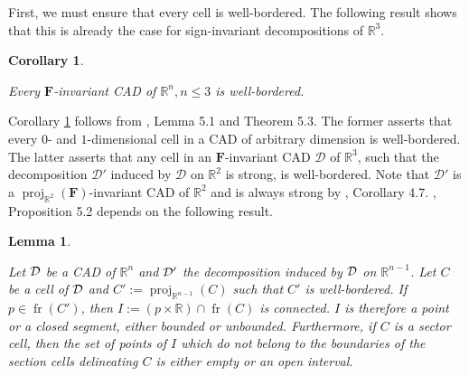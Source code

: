 \documentclass[
]{book}
\newtheorem{lemma}{Lemma}[chapter]
\newtheorem{corollary}{Corollary}[chapter]
\theoremstyle{definition}
\theoremstyle{definition}
\theoremstyle{definition}
\theoremstyle{definition}
\theoremstyle{remark}
\begin{document}
First, we must ensure that every cell is well-bordered. The following result shows that this is already the case for sign-invariant decompositions of \(\mathbb{R}^3\).

\begin{corollary}
\protect\hypertarget{cor:lazard-5-4}{}\label{cor:lazard-5-4}\citep[Corollary 5.4]{lazard10}

Every \(\mathbf{F}\)-invariant CAD of \(\mathbb{R}^n, n \le 3\) is well-bordered.
\end{corollary}

Corollary \ref{cor:lazard-5-4} follows from \citet{lazard10}, Lemma 5.1 and Theorem 5.3.
The former asserts that every \(0\)- and \(1\)-dimensional cell in a CAD of arbitrary dimension is well-bordered.
The latter asserts that any cell in an \(\mathbf{F}\)-invariant CAD \(\mathcal{D}\) of \(\mathbb{R}^3\), such that the decomposition \(\mathcal{D}'\) induced by \(\mathcal{D}\) on \(\mathbb{R}^2\) is strong, is well-bordered.
Note that \(\mathcal{D}'\) is a \({\operatorname{proj}_{\mathbb{R}^{2}}}(\mathbf{F})\)-invariant CAD of \(\mathbb{R}^2\) and is always strong by \citet{lazard10}, Corollary 4.7.
\citet{lazard10}, Proposition 5.2 depends on the following result.

\begin{lemma}
\protect\hypertarget{lem:lazard-5-2}{}\label{lem:lazard-5-2}\citep[Proposition 5,2]{lazard10}

Let \(\cal D\) be a CAD of \(\mathbb{R}^n\) and \(\cal D'\) the decomposition induced by \(\cal D\) on \(\mathbb{R}^{n-1}\). Let \(C\) be a cell of \(\cal D\) and \(C' := {\operatorname{proj}_{\mathbb{R}^{n-1}}} (C)\) such that \(C'\) is well-bordered.
If \(p \in {\operatorname{fr} \left( C' \right)}\), then \(I := (p \times \mathbb{R}) \cap {\operatorname{fr} \left( C \right)}\) is connected.
\(I\) is therefore a point or a closed segment, either bounded or unbounded.
Furthermore, if \(C\) is a sector cell, then the set of points of \(I\) which do not belong to the boundaries of the section cells delineating \(C\) is either empty or an open interval.
\end{lemma}
\end{document}
